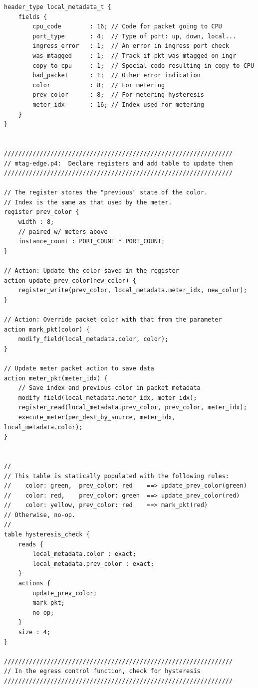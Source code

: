\documentclass[12pt]{article}
\begin{document}
\begin{itemize}
\begin{lstlisting}[keywords={},frame=single,escapechar=\@]
header_type local_metadata_t {
    fields {
        cpu_code        : 16; // Code for packet going to CPU
        port_type       : 4;  // Type of port: up, down, local...
        ingress_error   : 1;  // An error in ingress port check
        was_mtagged     : 1;  // Track if pkt was mtagged on ingr
        copy_to_cpu     : 1;  // Special code resulting in copy to CPU
        bad_packet      : 1;  // Other error indication
        color           : 8;  // For metering
        prev_color      : 8;  // For metering hysteresis
        meter_idx       : 16; // Index used for metering
    }
}


////////////////////////////////////////////////////////////////
// mtag-edge.p4:  Declare registers and add table to update them
////////////////////////////////////////////////////////////////

// The register stores the "previous" state of the color.
// Index is the same as that used by the meter.
register prev_color {
    width : 8;
    // paired w/ meters above
    instance_count : PORT_COUNT * PORT_COUNT;
}

// Action: Update the color saved in the register
action update_prev_color(new_color) {
    register_write(prev_color, local_metadata.meter_idx, new_color);
}

// Action: Override packet color with that from the parameter
action mark_pkt(color) {
    modify_field(local_metadata.color, color);
}

// Update meter packet action to save data
action meter_pkt(meter_idx) {
    // Save index and previous color in packet metadata
    modify_field(local_metadata.meter_idx, meter_idx);
    register_read(local_metadata.prev_color, prev_color, meter_idx);
    execute_meter(per_dest_by_source, meter_idx, local_metadata.color);
}


//
// This table is statically populated with the following rules:
//    color: green,  prev_color: red    ==> update_prev_color(green)
//    color: red,    prev_color: green  ==> update_prev_color(red)
//    color: yellow, prev_color: red    ==> mark_pkt(red)
// Otherwise, no-op.
//
table hysteresis_check {
    reads {
        local_metadata.color : exact;
        local_metadata.prev_color : exact;
    }
    actions {
        update_prev_color;
        mark_pkt;
        no_op;
    }
    size : 4;
}

////////////////////////////////////////////////////////////////
// In the egress control function, check for hysteresis
////////////////////////////////////////////////////////////////


\end{lstlisting}
\end{itemize}
\end{document}
